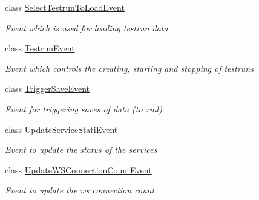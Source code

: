 \begin{DoxyCompactItemize}
class \hyperlink{class_web_analyzer_1_1_events_1_1_select_testrun_to_load_event}{Select\+Testrun\+To\+Load\+Event}
\begin{DoxyCompactList}\small\item\em Event which is used for loading testrun data \end{DoxyCompactList}\item 
class \hyperlink{class_web_analyzer_1_1_events_1_1_testrun_event}{Testrun\+Event}
\begin{DoxyCompactList}\small\item\em Event which controls the creating, starting and stopping of testruns \end{DoxyCompactList}\item 
class \hyperlink{class_web_analyzer_1_1_events_1_1_trigger_save_event}{Trigger\+Save\+Event}
\begin{DoxyCompactList}\small\item\em Event for triggering saves of data (to xml) \end{DoxyCompactList}\item 
class \hyperlink{class_web_analyzer_1_1_events_1_1_update_service_stati_event}{Update\+Service\+Stati\+Event}
\begin{DoxyCompactList}\small\item\em Event to update the status of the services \end{DoxyCompactList}\item 
class \hyperlink{class_web_analyzer_1_1_events_1_1_update_w_s_connection_count_event}{Update\+W\+S\+Connection\+Count\+Event}
\begin{DoxyCompactList}\small\item\em Event to update the ws connection count \end{DoxyCompactList}\end{DoxyCompactItemize}
